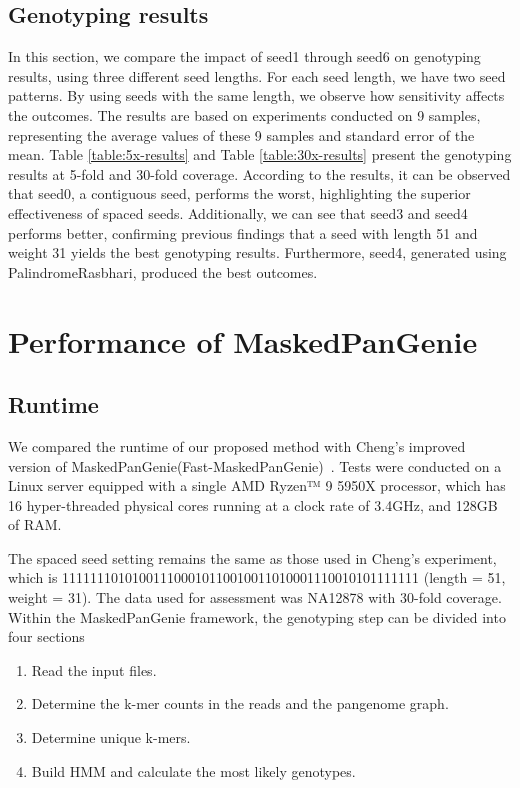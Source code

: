 \documentclass[PhD]{PHlab-thesis}
\begin{document}
\subsection{Genotyping results}
In this section, we compare the impact of seed1 through seed6 on genotyping results, using three different seed lengths. For each seed length, we have two seed patterns. By using seeds with the same length, we observe how sensitivity affects the outcomes. The results are based on experiments conducted on 9 samples, representing the average values of these 9 samples and standard error of the mean. Table \ref{table:5x-results} and Table \ref{table:30x-results} present the genotyping results at 5-fold and 30-fold coverage. According to the results, it can be observed that seed0, a contiguous seed, performs the worst, highlighting the superior effectiveness of spaced seeds. Additionally, we can see that seed3 and seed4 performs better, confirming previous findings that a seed with length 51 and weight 31 yields the best genotyping results. Furthermore, seed4, generated using PalindromeRasbhari, produced the best outcomes. 

\section{Performance of MaskedPanGenie}
\subsection{Runtime}
We compared the runtime of our proposed method with Cheng's improved version of MaskedPanGenie(Fast-MaskedPanGenie)~\cite{garyMaskedPanGenie}. Tests were conducted on a Linux server equipped with a single AMD Ryzen™ 9 5950X processor, which has 16 hyper-threaded physical cores running at a clock rate of 3.4GHz, and 128GB of RAM. 

The spaced seed setting remains the same as those used in Cheng's experiment, which is 111111101010011100010110010011010001110010101111111 (length = 51, weight = 31). The data used for assessment was NA12878 with 30-fold coverage. Within the MaskedPanGenie framework, the genotyping step can be divided into four sections
\begin{enumerate}[label=(\alph*)]
\item Read the input files.
\item Determine the k-mer counts in the reads and the pangenome graph.
\item Determine unique k-mers.
\item Build HMM and calculate the most likely genotypes.
\end{enumerate}
\end{document}
